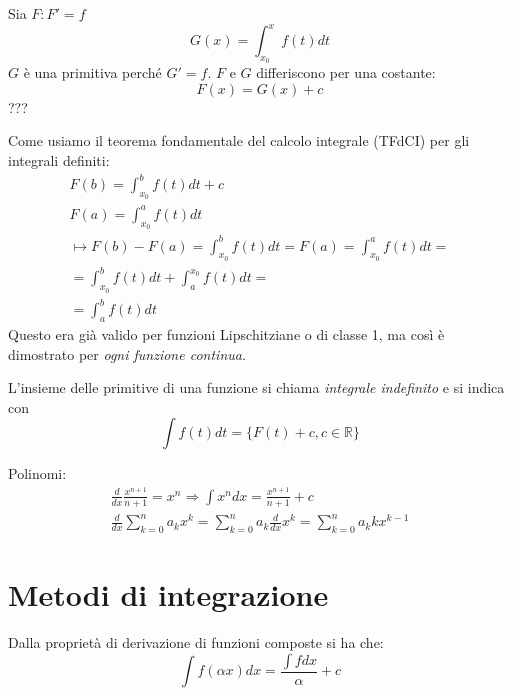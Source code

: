 \begin{dimostrazione}
    Sia $F: F' = f$
    \begin{equation}
        G(x) = \int_{x_0}^{x} f(t) dt
    \end{equation}
    $G$ è una primitiva perché $G' = f$. $F$ e $G$ differiscono per una costante:
    \begin{equation*}
        F(x) = G(x) + c
    \end{equation*}
    ???
\end{dimostrazione}

Come usiamo il teorema fondamentale del calcolo integrale (TFdCI) per gli integrali definiti: \\
\begin{gather}
    F(b) = \int_{x_0}^{b} f(t) dt + c \\
    F(a) = \int_{x_0}^{a} f(t) dt \\
    \mapsto F(b) - F(a) = \int_{x_0}^{b} f(t) dt = F(a) = \int_{x_0}^{a} f(t) dt =\\
    = \int_{x_0}^{b} f(t) dt + \int_{a}^{x_0} f(t) dt = \\
    = \int_{a}^{b} f(t) dt
\end{gather}
Questo era già valido per funzioni Lipschitziane o di classe 1, ma così è dimostrato per \textit{ogni funzione continua}.

\begin{definizione}
    L'insieme delle primitive di una funzione si chiama \textit{integrale indefinito} e si indica con
    \begin{equation}
        \int f(t) dt = \{F(t) + c, c\in \mathbb{R}\}
    \end{equation}
\end{definizione}

\begin{esempio}
    Polinomi:
    \begin{gather}
        \frac{d}{dx} \frac{x^{n+1}}{n+1}=x^n \Rightarrow \int x^n dx = \frac{x^{n+1}}{n+1}+c \\
        \frac{d}{dx} \sum_{k=0}^{n}a_{k}x^k=\sum_{k=0}^{n}a_k \frac{d}{dx}x^k = \sum_{k=0}^{n}a_k kx^{k-1}
    \end{gather}
\end{esempio}

\section{Metodi di integrazione}
\begin{proprieta}
    Dalla proprietà di derivazione di funzioni composte si ha che:
    \begin{equation}
        \int f(\alpha x) dx = \frac{\int f dx}{\alpha} + c
    \end{equation}
\end{proprieta}

